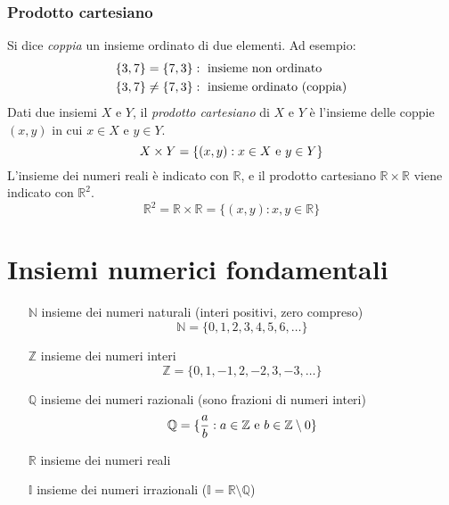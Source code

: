 \documentclass[11pt]{book}
\begin{document}
\subsubsection*{Prodotto cartesiano}
Si dice \textit{coppia} un insieme ordinato di due elementi. Ad esempio:
\begin{align*}
    \{3,7\}&=\{7,3\}:\textnormal{ insieme non ordinato}\\
    \{3,7\}&\neq\{7,3\}:\textnormal{ insieme ordinato (coppia)}
\end{align*}
Dati due insiemi $X$ e $Y$, il \textit{prodotto cartesiano} di $X$ e $Y$ è l'insieme delle coppie $(x,y)$ in cui $x\in X$
e $y\in Y$.
\begin{equation*}
    X\times Y=\{(x,y):x\in X\textnormal{ e }y\in Y\}
\end{equation*}
L'insieme dei numeri reali è indicato con $\mathbb{R}$, e il prodotto cartesiano $\mathbb{R}\times\mathbb{R}$ viene 
indicato con $\mathbb{R}^2$.
\begin{equation*}
    \mathbb{R}^2=\mathbb{R}\times\mathbb{R}=\{(x,y):x,y\in\mathbb{R}\}
\end{equation*}
\section{Insiemi numerici fondamentali}
\begin{itemize}
    \item [$\mathbb{N}$] insieme dei numeri naturali (interi positivi, zero compreso)
    \begin{equation*}
        \mathbb{N}=\{0,1,2,3,4,5,6,\dots\}
    \end{equation*}
    \item [$\mathbb{Z}$] insieme dei numeri interi
    \begin{equation*}
        \mathbb{Z}=\{0,1,-1,2,-2,3,-3,\dots\}
    \end{equation*}
    \item [$\mathbb{Q}$] insieme dei numeri razionali (sono frazioni di numeri interi)
    \begin{equation*}
        \mathbb{Q}=\{\frac{a}{b}:a\in\mathbb{Z}\textnormal{ e }b\in\mathbb{Z}\setminus 0\}
    \end{equation*}
    \item [$\mathbb{R}$] insieme dei numeri reali
    \item [$\mathbb{I}$] insieme dei numeri irrazionali ($\mathbb{I}=\mathbb{R}\setminus\mathbb{Q}$)
\end{itemize}
\end{document}

